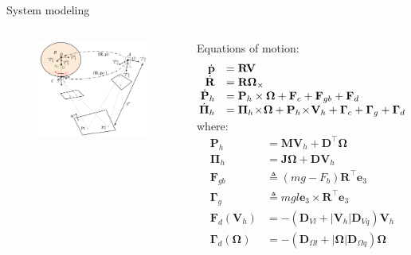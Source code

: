 \documentclass{beamer}
\begin{document}
\begin{frame}{System modeling}
	\begin{columns}
		\begin{figure}
			\includegraphics[width = 55mm]{Images/Notation.png}
		\end{figure}
		\begin{block}{Equations of motion:}
			\scriptsize
			\begin{equation*}\label{eq:system2}
			\begin{array}{rl}
			\dot{\mathbf{p}} & =  \mathbf{R} \mathbf{V} \\
			\dot{\mathbf{R}} & =  \mathbf{R} \mathbf{\Omega}_\times \\
			\!\!\dot{\mathbf{P}}_h &= \mathbf{P}_h \times \mathbf{\Omega} +\mathbf{F}_c + \mathbf{F}_{gb} + \mathbf{F}_d  \\
			\!\!\dot{\mathbf{\Pi}}_h &=  \mathbf{\Pi}_h \!\times\! \mathbf{\mathbf{\Omega}} + \mathbf{P}_h \!\times \!\mathbf{V}_h  +\mathbf{\Gamma}_c + \mathbf{\Gamma}_g + \mathbf{\Gamma}_d \!\!\vspace{-0.2cm}
			\end{array}
			\end{equation*} \vspace{-0.3cm}
			where: \\
			\begin{equation*}
			\begin{array}{rl}
			\mathbf{P}_h & = \mathbf{M}\mathbf{V}_h + \mathbf{D}^{\!\top} \mathbf{\Omega}\\[1ex]
			\mathbf{\Pi}_h & = \mathbf{J} \mathbf{\Omega} + \mathbf{D}\mathbf{V}_h \\
			\mathbf{F}_{gb}  &\triangleq (m g - F_b) \mathbf{R}^{\!\top} \mathbf{e}_3\\
			\mathbf{\Gamma}_g  &\triangleq mgl\mathbf{e}_{3}\! \times \!\mathbf{R}^{\!\top} \mathbf{e}_3\\
			\mathbf{F}_d(\mathbf{V}_h) & = - (\mathbf{D}_{V\!l}   +|\mathbf{V}_h|\mathbf{D}_{V\!q} )\mathbf{V}_h  \\
			\mathbf{\Gamma}_d(\mathbf{\Omega})& =  - (\mathbf{D}_{\Omega l}  + |\mathbf{\Omega}|\mathbf{D}_{\Omega q} )\mathbf{\Omega}
			\end{array}
			\end{equation*}
		\end{block}
	\end{columns}

\end{frame}
\end{document}
